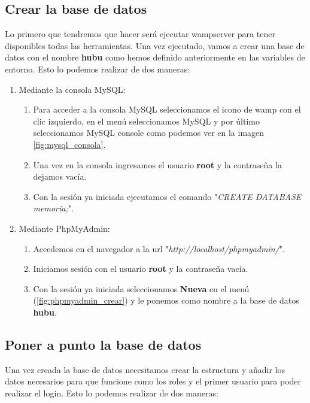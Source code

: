 \subsection{Crear la base de datos}

Lo primero que tendremos que hacer será ejecutar wampserver para tener disponibles todas las herramientas. Una vez ejecutado, vamos a crear una base de datos con el nombre \textbf{hubu} como hemos definido anteriormente en las variables de entorno. Esto lo podemos realizar de dos maneras:

\begin{enumerate}
    \item Mediante la consola MySQL:
    \begin{enumerate}
        \item Para acceder a la consola MySQL seleccionamos el icono de wamp con el clic izquierdo, en el menú seleccionamos MySQL y por último seleccionamos MySQL console como podemos ver en la imagen \ref{fig:mysql_consola}.
        \item Una vez en la consola ingresamos el usuario \textbf{root} y la contraseña la dejamos vacía.
        \item Con la sesión ya iniciada ejecutamos el comando "\textit{CREATE DATABASE memoria;}".
    \end{enumerate}
    \item Mediante PhpMyAdmin:
    \begin{enumerate}
        \item Accedemos en el navegador a la url "\textit{http://localhost/phpmyadmin/}".
        \item Iniciamos sesión con el usuario \textbf{root} y la contraseña vacía.
        \item Con la sesión ya iniciada seleccionamos \textbf{Nueva} en el menú (\ref{fig:phpmyadmin_crear}) y le ponemos como nombre a la base de datos \textbf{hubu}.
    \end{enumerate}
\end{enumerate}

\subsection{Poner a punto la base de datos}

Una vez creada la base de datos necesitamos crear la estructura y añadir los datos necesarios para que funcione como los roles y el primer usuario para poder realizar el login. Esto lo podemos realizar de dos maneras:

